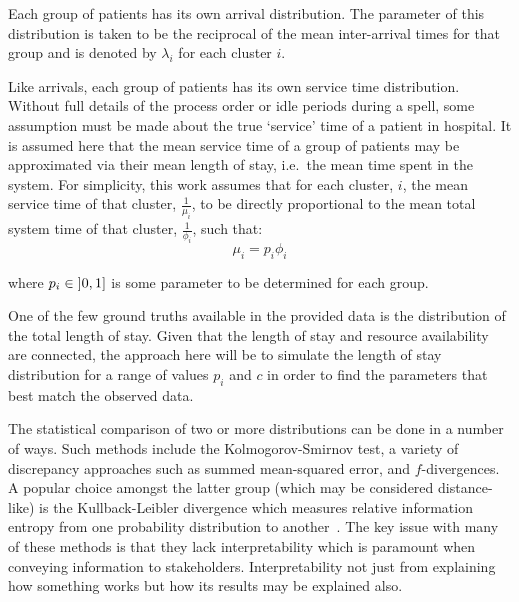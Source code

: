Each group of patients has its own arrival distribution. The parameter of this
distribution is taken to be the reciprocal of the mean inter-arrival times for
that group and is denoted by \(\lambda_i\) for each cluster \(i\).

Like arrivals, each group of patients has its own service time distribution.
Without full details of the process order or idle periods during a spell, some
assumption must be made about the true `service' time of a patient in hospital.
It is assumed here that the mean service time of a group of patients may be
approximated via their mean length of stay, i.e.\ the mean time spent in the
system. For simplicity, this work assumes that for each cluster, \(i\), the mean
service time of that cluster, \(\frac{1}{\mu_i}\), to be directly proportional
to the mean total system time of that cluster, \(\frac{1}{\phi_i}\), such that:
\begin{equation}\label{eq:services}
    \mu_i = p_i \phi_i
\end{equation}

\noindent where \(p_i \in \interval[open left]{0}{1}\) is some parameter to be
determined for each group.

One of the few ground truths available in the provided data is the distribution
of the total length of stay. Given that the length of stay and resource
availability are connected, the approach here will be to simulate the length of
stay distribution for a range of values \(p_i\) and \(c\) in order to find the
parameters that best match the observed data.

The statistical comparison of two or more distributions can be done in a number
of ways. Such methods include the Kolmogorov-Smirnov test, a variety of
discrepancy approaches such as summed mean-squared error, and \(f\)-divergences.
A popular choice amongst the latter group (which may be considered
distance-like) is the Kullback-Leibler divergence which measures relative
information entropy from one probability distribution to
another~\cite{Kullback1951}. The key issue with many of these methods is that
they lack interpretability which is paramount when conveying information to
stakeholders. Interpretability not just from explaining how something works but
how its results may be explained also.

